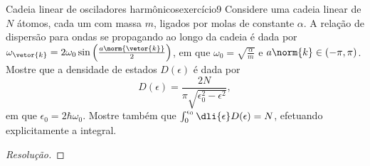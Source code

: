 \begin{exercício}{Cadeia linear de osciladores harmônicos}{exercício9}
    Considere uma cadeia linear de \(N\) átomos, cada um com massa \(m\), ligados por molas de constante \(\alpha\). A relação de dispersão para ondas se propagando ao longo da cadeia é dada por \(\omega_{\vetor{k}} = 2 \omega_0 \sin\left(\frac{a \norm{\vetor{k}}}{2}\right)\), em que \(\omega_0 = \sqrt{\frac{\alpha}{m}}\) e \(a \norm{k} \in (-\pi,\pi)\). Mostre que a densidade de estados \(D(\epsilon)\) é dada por
    \begin{equation*}
        D(\epsilon) = \frac{2N}{\pi\sqrt{\epsilon_0^2 - \epsilon^2}},
    \end{equation*}
    em que \(\epsilon_0 = 2\hbar \omega_0\). Mostre também que \(\int_0^{\epsilon_0} \dli{\epsilon} D(\epsilon) = N\), efetuando explicitamente a integral.
\end{exercício}
\begin{proof}[Resolução]

\end{proof}
